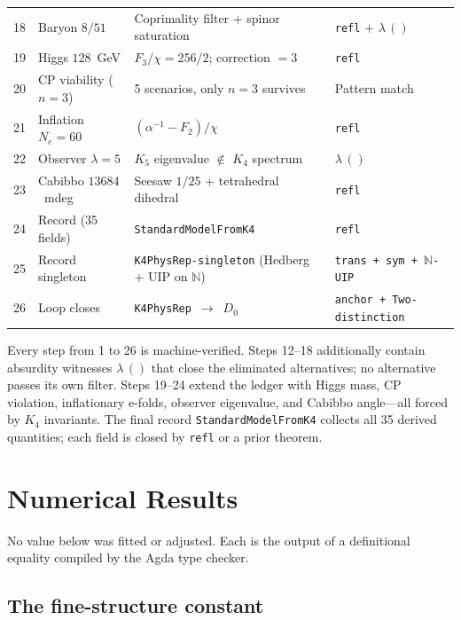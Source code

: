 \documentclass[11pt,a4paper]{article}
\theoremstyle{definition}
\begin{document}
\begin{center}
\begin{tabular}{@{}rlp{5.5cm}p{3.5cm}@{}}
18 & Baryon $8/51$          & Coprimality filter + spinor saturation & \texttt{refl} + $\lambda\,()$ \\
19 & Higgs $128$~GeV        & $F_3 / \chi = 256 / 2$; correction $= 3$ & \texttt{refl} \\
20 & CP viability ($n{=}3$) & 5 scenarios, only $n{=}3$ survives & Pattern match \\
21 & Inflation $N_e = 60$   & $(\alpha^{-1} - F_2)/\chi$ & \texttt{refl} \\
22 & Observer $\lambda = 5$ & $K_5$ eigenvalue $\notin$ $K_4$ spectrum & $\lambda\,()$ \\
23 & Cabibbo $13684$~mdeg   & Seesaw $1/25$ + tetrahedral dihedral & \texttt{refl} \\
24 & Record (35 fields)     & \texttt{StandardModelFromK4} & \texttt{refl} \\
25 & Record singleton       & \texttt{K4PhysRep-singleton} (Hedberg + UIP on $\mathbb{N}$) & \texttt{trans + sym + $\mathbb{N}$-UIP} \\
26 & Loop closes            & \texttt{K4PhysRep}~$\to$~$D_0$ & \texttt{anchor + Two-distinction} \\
\bottomrule
\end{tabular}
\end{center}

\noindent
Every step from 1 to 26 is machine-verified.  Steps 12--18 additionally
contain absurdity witnesses $\lambda\,()$ that close the eliminated
alternatives; no alternative passes its own filter.  Steps 19--24 extend
the ledger with Higgs mass, CP violation, inflationary e-folds, observer
eigenvalue, and Cabibbo angle---all forced by $K_4$ invariants.
The final record \texttt{StandardModelFromK4} collects all 35 derived
quantities; each field is closed by \texttt{refl} or a prior theorem.

\section{Numerical Results}
\label{sec:numbers}

No value below was fitted or adjusted.  Each is the output of a definitional
equality compiled by the Agda type checker.

\subsection{The fine-structure constant}
\end{document}
